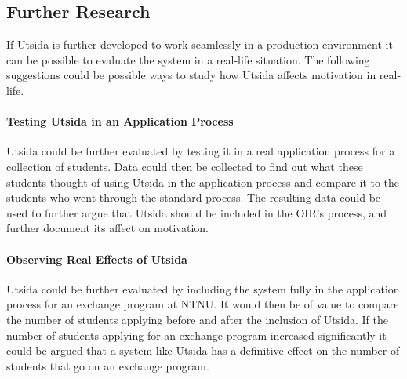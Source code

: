 \subsection{Further Research}

If Utsida is further developed to work seamlessly in a production environment it can be possible to evaluate the system in a real-life situation. The following suggestions could be possible ways to study how Utsida affects motivation in real-life.

\paragraph{Testing Utsida in an Application Process} Utsida could be further evaluated by testing it in a real application process for a collection of students. Data could then be collected to find out what these students thought of using Utsida in the application process and compare it to the students who went through the standard process. The resulting data could be used to further argue that Utsida should be included in the OIR's process, and further document its affect on motivation.

\paragraph{Observing Real Effects of Utsida} Utsida could be further evaluated by including the system fully in the application process for an exchange program at NTNU. It would then be of value to compare the number of students applying before and after the inclusion of Utsida. If the number of students applying for an exchange program increased significantly it could be argued that a system like Utsida has a definitive effect on the number of students that go on an exchange program. 


\cleardoublepage